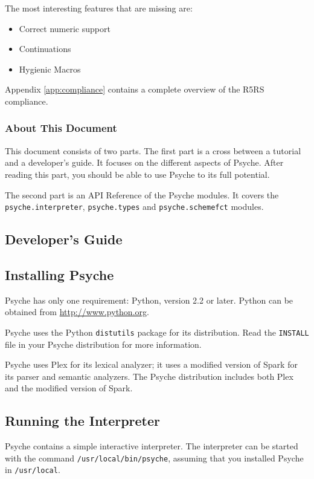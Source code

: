 \documentclass{report}
\newcommand{\code}[1]{\texttt{#1}}
\newcommand{\file}[1]{\texttt{#1}}
\begin{document}
The most interesting features that are missing are:
\begin{itemize}
\item Correct numeric support
\item Continuations
\item Hygienic Macros
\end{itemize}

Appendix \ref{app:compliance} contains a complete overview of the R5RS
compliance. 


\section{About This Document}
This document consists of two parts. The first part is a cross between
a tutorial and a developer's guide. It focuses on the different aspects
of Psyche. After reading this part, you should be able to use Psyche
to its full potential.

The second part is an API Reference of the Psyche modules. It covers
the \code{psyche.interpreter}, \code{psyche.types} and
\code{psyche.schemefct} modules.

\begin{latexonly}   %
\part{Developer's Guide}
\end{latexonly}

%
%
\chapter{Installing Psyche}
\label{chap:installing}
Psyche has only one requirement: Python, version 2.2 or later. Python
can be obtained from \url{http://www.python.org}. 

Psyche uses the Python \file{distutils} package for its
distribution. Read the \file{INSTALL} file in your Psyche
distribution for more information.

Psyche uses Plex\cite{plex} for its lexical analyzer; it uses a
modified version of Spark\cite{spark} for its parser and semantic
analyzers. The Psyche distribution includes both Plex and the modified
version of Spark.


%
%
\chapter{Running the Interpreter}
\label{chap:shell}
Psyche contains a simple interactive interpreter. The interpreter can
be started with the command \file{/usr/local/bin/psyche},
assuming that you installed Psyche in \file{/usr/local}.
\end{document}
